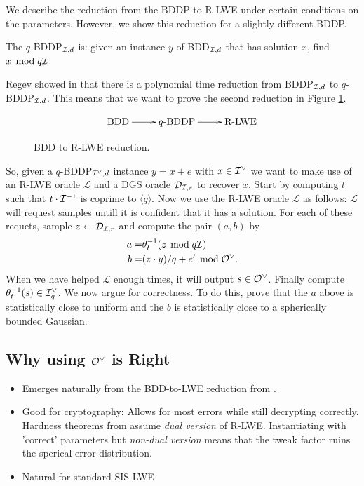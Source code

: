     We describe the reduction from the BDDP to R-LWE under certain conditions on the parameters. However, we show this reduction for a slightly different BDDP.
    \begin{definition}
        The \(q\)-BDDP\(_{\mathcal{I}, d}\) is: given an instance \(y\) of BDD\(_{\mathcal{I}, d}\) that has solution \(x\), find \(x\mathop{}\!\mathrm{\; mod \;} q\mathcal{I}\)
    \end{definition}
    Regev showed in \cite{Reg05} that there is a polynomial time reduction from BDDP\(_{\mathcal{I}, d}\) to \(q\)-BDDP\(_{\mathcal{I}, d}\). This means that we want to prove the second reduction in Figure \ref{fig:BDD to R-LWE Reduction}.
    \begin{figure}
        \[
        \xymatrix{\text{BDD}\ar[r] & q\text{-BDDP}\ar[r] & \text{R-LWE}}
        \]
        \caption{BDD to R-LWE reduction.}
        \label{fig:BDD to R-LWE Reduction}
    \end{figure}
    So, given a \(q\)-BDDP\(_{\mathcal{I}^\vee, d}\) instance \(y = x + e\) with \(x\in\mathcal{I}^\vee\) we want to make use of an R-LWE oracle \(\mathcal{L}\) and a DGS oracle \(\mathcal{D}_{\mathcal{I}, r}\) to recover \(x\). Start by computing \(t\) such that \(t\cdot\mathcal{I}^{-1}\) is coprime to \(\langle q \rangle\). Now we use the R-LWE oracle \(\mathcal{L}\) as follows: \(\mathcal{L}\) will request samples untill it is confident that it has a solution. For each of these requets, sample \(z\leftarrow\mathcal{D}_{\mathcal{I}, r}\) and compute the pair \((a, b)\) by
    \begin{equation*}
        \begin{split}
            a = &\theta_t^{-1} (z\mathop{}\!\mathrm{\; mod \;} q\mathcal{I}) \\
            b = &(z\cdot y)/q + e'\mathop{}\!\mathrm{\; mod \;}\mathcal{O}^\vee.
        \end{split}
    \end{equation*}
    When we have helped \(\mathcal{L}\) enough times, it will output \(s\in\mathcal{O}^\vee\). Finally compute \(\theta_t^{-1}(s) \in \mathcal{I}_q^\vee\). We now argue for correctness. To do this, prove that the \(a\) above is statistically close to uniform and the \(b\) is statistically close to a spherically bounded Gaussian.
    
\subsection{Why using \(\mathcal{O}^\vee\) is Right}
    \begin{itemize}
        \item Emerges naturally from the BDD-to-LWE reduction from \cite{First R-LWE}.
        
        \item Good for cryptography: Allows for most errors while still decrypting correctly. Hardness theorems from \cite{First R-LWE} assume \emph{dual version} of R-LWE. Instantiating with 'correct' parameters but \emph{non-dual version} means that the tweak factor ruins the sperical error distribution.
        
        \item Natural for standard SIS-LWE 
    \end{itemize}
    


